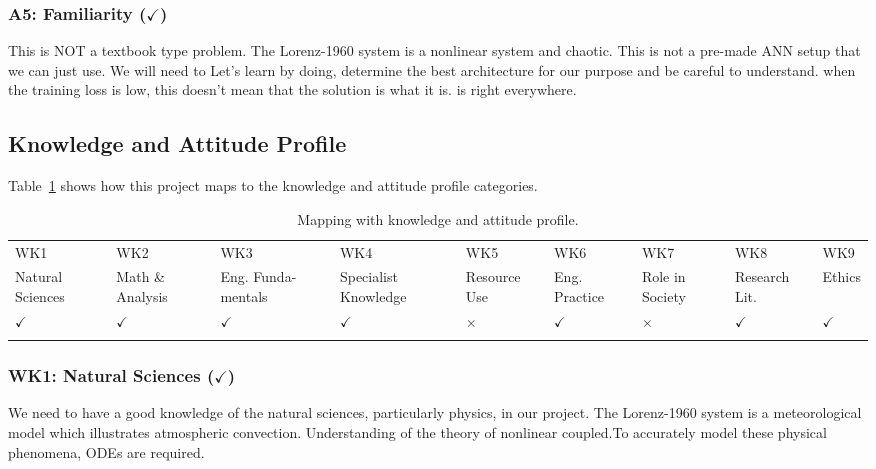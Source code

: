\subsubsection{A5: Familiarity ($\checkmark$)}
This is NOT a textbook type problem. The Lorenz-1960 system is a nonlinear system and chaotic. This is not a pre-made ANN setup that we can just use. We will need to
Let's learn by doing, determine the best architecture for our purpose and be careful to understand. when the training loss is low, this doesn't mean that the solution is what it is.
is right everywhere.



\subsection{Knowledge and Attitude Profile}

Table~\ref{tab:k_profile} shows how this project maps to the knowledge and attitude profile categories.

\begin{center}
    \begin{table}[ht]
        \centering
        \caption{Mapping with knowledge and attitude profile.}
        \begin{tabular}{|p{}|p{}|p{}|p{}|p{}|p{}|p{}|p{}|p{}|}
        \hline
        WK1& WK2& WK3& WK4& WK5& WK6& WK7& WK8& WK9\\
        Natural Sciences & Math \& Analysis & Eng. Funda- mentals & Specialist Knowledge & Resource Use & Eng. Practice & Role in Society & Research Lit. & Ethics\\
        \hline 
        $\checkmark$ & $\checkmark$ & $\checkmark$ & $\checkmark$ & $\times$ & $\checkmark$ & $\times$ & $\checkmark$ & $\checkmark$\\
        &&&&&&&&\\
        \hline 
        \end{tabular}
        \label{tab:k_profile}
    \end{table}
\end{center}

\subsubsection{WK1: Natural Sciences ($\checkmark$)}

We need to have a good knowledge of the natural sciences, particularly physics, in our project.
The Lorenz-1960 system is a meteorological model which illustrates atmospheric convection. Understanding of the theory of nonlinear coupled.To accurately model these physical phenomena, ODEs are required.


